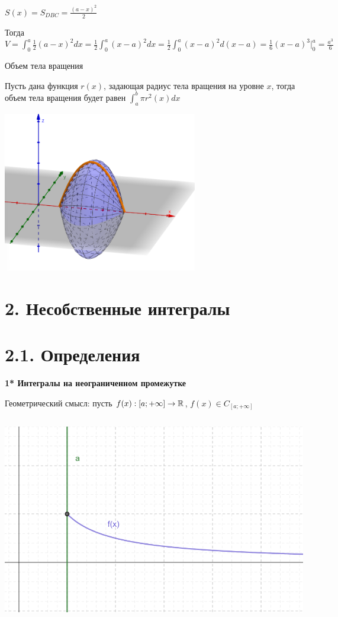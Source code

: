 \documentclass[12pt]{article}
\begin{document}
    $S(x) = S_{DBC} = \frac{(a - x)^2}{2}$

    Тогда $V = \int_0^a \frac{1}{2} (a - x)^2 dx = \frac{1}{2} \int_0^a (x - a)^2 dx =
    \frac{1}{2} \int^a_0 (x - a)^2 d(x - a) = \frac{1}{6} (x - a)^3 \Big|^a_0 = \frac{a^3}{6}$

    \Nota \hypertarget{volumeofbodyofrevolution}{Объем тела вращения}

    Пусть дана функция $r(x)$, задающая радиус тела вращения на уровне $x$,
    тогда объем тела вращения будет равен $\int_a^b \pi r^2(x) dx$

    \includegraphics[height=7cm]{calculus/images/calculus_2024_02_14_4}



    \clearpage

    \section{2. Несобственные интегралы}

    \section{2.1. Определения}

    \textbf{1* Интегралы на неограниченном промежутке}

    Геометрический смысл: пусть $f(x) : [a; +\infty] \to \mathbb{R}$, $f(x) \in C_{[a; +\infty]}$

    \includegraphics[height=90mm]{calculus/images/calculus_2024_02_21_1}
\end{document}
